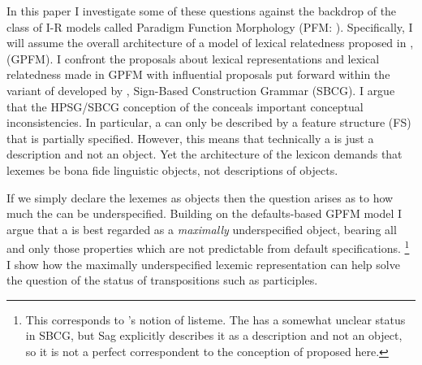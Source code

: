 \documentclass[output=paper]{langsci/langscibook}
\begin{document}
\begin{sloppypar}%
In this paper I investigate some of these questions against the backdrop of the class of I-R models called Paradigm Function Morphology (PFM: \citealt{Stump01:book,Bonami:Stump16:PFM}). Specifically, I will assume the overall architecture of a model of lexical relatedness proposed in \citet{Spencer13},  (GPFM). I confront the proposals  about lexical representations and lexical relatedness made in GPFM with influential proposals put forward within the variant of  developed by \citet{Sag12}, Sign-Based Construction Grammar (SBCG). I argue that the HPSG/SBCG conception of the  conceals important conceptual inconsistencies. In particular, a  can only be described by a feature structure (FS) that is partially specified. However, this means that technically a  is just a description and not an object. Yet the architecture of the  lexicon demands that lexemes be bona fide linguistic objects, not descriptions of objects.\end{sloppypar}


If we simply declare the lexemes as objects then the question arises as to how much the  can be underspecified. Building on the defaults-based GPFM model I argue that a  is best regarded as a \emph{maximally} underspecified object, bearing all and only those properties which are not predictable from default specifications.%
\footnote{This corresponds to \citeauthor{Sag12}'s \citeyear{Sag12} notion of listeme.
The   has a somewhat unclear status in SBCG, but Sag explicitly describes it as a description and not an object, so it is not a perfect correspondent to the conception of  proposed here.
} %
I show how the maximally underspecified lexemic representation can help solve the question of the status of transpositions such as participles.
\end{document}
